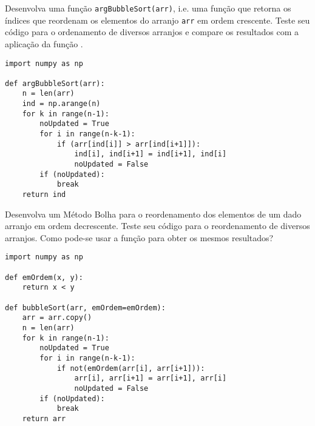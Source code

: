 \begin{exer}
  Desenvolva uma função \lstinline+argBubbleSort(arr)+, i.e. uma função que retorna os índices que reordenam os elementos do arranjo \lstinline+arr+ em ordem crescente. Teste seu código para o ordenamento de diversos arranjos e compare os resultados com a aplicação da função {\PYTHONnumpyDOTargsort}.
\end{exer}
\begin{resp}

\begin{lstlisting}
import numpy as np

def argBubbleSort(arr):
    n = len(arr)
    ind = np.arange(n)
    for k in range(n-1):
        noUpdated = True
        for i in range(n-k-1):
            if (arr[ind[i]] > arr[ind[i+1]]):
                ind[i], ind[i+1] = ind[i+1], ind[i]
                noUpdated = False
        if (noUpdated):
            break
    return ind
\end{lstlisting}

\end{resp}

\begin{exer}
  Desenvolva um Método Bolha para o reordenamento dos elementos de um dado arranjo em ordem decrescente. Teste seu código para o reordenamento de diversos arranjos. Como pode-se usar a função {\PYTHONnumpyDOTsort} para obter os mesmos resultados?
\end{exer}
\begin{resp}

\begin{lstlisting}
import numpy as np

def emOrdem(x, y):
    return x < y

def bubbleSort(arr, emOrdem=emOrdem):
    arr = arr.copy()
    n = len(arr)
    for k in range(n-1):
        noUpdated = True
        for i in range(n-k-1):
            if not(emOrdem(arr[i], arr[i+1])):
                arr[i], arr[i+1] = arr[i+1], arr[i]
                noUpdated = False
        if (noUpdated):
            break
    return arr
\end{lstlisting}

\end{resp}

